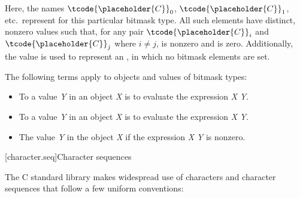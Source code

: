 \pnum
Here, the names $\tcode{\placeholder{C}}_0$,
$\tcode{\placeholder{C}}_1$, etc.\ represent
for this particular bitmask type.
%
All such elements have distinct, nonzero values such that, for any pair $\tcode{\placeholder{C}}_i$
and $\tcode{\placeholder{C}}_j$ where $i \neq j$,  is nonzero and
 is zero.
Additionally, the value  is used to represent an , in which no
bitmask elements are set.

\pnum
The following terms apply to objects and values of
bitmask types:
\begin{itemize}
\item
To 
a value \textit{Y} in an object \textit{X}
is to evaluate the expression \textit{X} \tcode{|=} \textit{Y}.
\item
To 
a value \textit{Y} in an object
\textit{X} is to evaluate the expression \textit{X} \tcode{\&= \~}\textit{Y}.
\item
The value \textit{Y}  in the object
\textit{X} if the expression \textit{X} \tcode{\&} \textit{Y} is nonzero.
\end{itemize}

[character.seq]{Character sequences}

\pnum
The C standard library makes widespread use
%
of characters and character sequences that follow a few uniform conventions:

